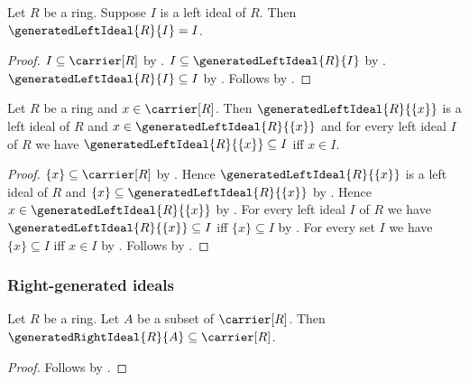 \begin{corollary}\label{generated_left_ideal_of_left_ideal}
    Let $R$ be a ring.
    Suppose $I$ is a left ideal of $R$.
    Then $\generatedLeftIdeal{R}{I}=I$.
\end{corollary}
\begin{proof}
    $I\subseteq\carrier[R]$ by .
    $I\subseteq\generatedLeftIdeal{R}{I}$ by
        .
    $\generatedLeftIdeal{R}{I}\subseteq I$ by
        .
    Follows by .
\end{proof}

\begin{theorem}\label{principal_left_ideal_properties}
    Let $R$ be a ring and $x\in\carrier[R]$.
    Then $\generatedLeftIdeal{R}{\{x\}}$ is a left ideal of $R$ and
        $x\in\generatedLeftIdeal{R}{\{x\}}$ and
        for every left ideal $I$ of $R$ we have
            $\generatedLeftIdeal{R}{\{x\}}\subseteq I$ iff $x\in I$.
\end{theorem}
\begin{proof}
    $\{x\}\subseteq\carrier[R]$ by .
    Hence $\generatedLeftIdeal{R}{\{x\}}$ is a left ideal of $R$ and
        $\{x\}\subseteq\generatedLeftIdeal{R}{\{x\}}$ by
        .
    Hence $x\in\generatedLeftIdeal{R}{\{x\}}$ by
        .
    For every left ideal $I$ of $R$ we have
        $\generatedLeftIdeal{R}{\{x\}}\subseteq I$ iff
        $\{x\}\subseteq I$ by
        .
    For every set $I$ we have $\{x\}\subseteq I$ iff $x\in I$ by
        .
    Follows by \auto.
\end{proof}

\subsubsection{Right-generated ideals}

\begin{proposition}\label{generated_right_ideal_subseteq_carrier}
    Let $R$ be a ring.
    Let $A$ be a subset of $\carrier[R]$.
    Then $\generatedRightIdeal{R}{A}\subseteq\carrier[R]$.
\end{proposition}
\begin{proof}
    Follows by .
\end{proof}

